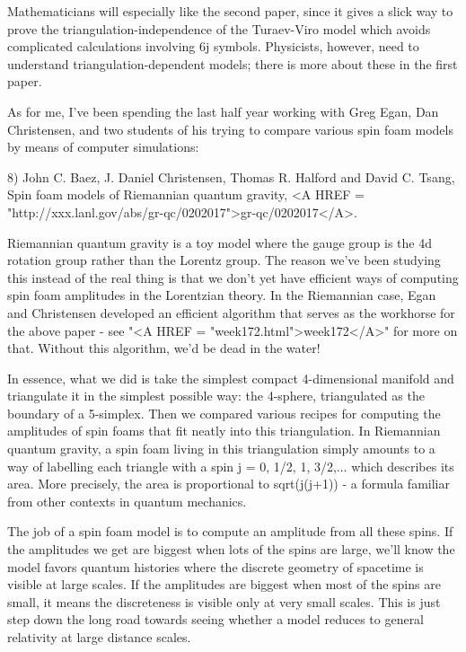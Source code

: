 Mathematicians will especially like the second paper, since it gives a
slick way to prove the triangulation-independence of the Turaev-Viro
model which avoids complicated calculations involving 6j symbols.  
Physicists, however, need to understand triangulation-dependent models;
there is more about these in the first paper.

As for me, I've been spending the last half year working with Greg Egan, 
Dan Christensen, and two students of his trying to compare various spin 
foam models by means of computer simulations:

8) John C. Baez, J. Daniel Christensen, Thomas R. Halford and
David C. Tsang, Spin foam models of Riemannian quantum gravity,
<A HREF = "http://xxx.lanl.gov/abs/gr-qc/0202017">gr-qc/0202017</A>.

Riemannian quantum gravity is a toy model where the gauge group is the
4d rotation group rather than the Lorentz group.  The reason we've been
studying this instead of the real thing is that we don't yet have
efficient ways of computing spin foam amplitudes in the Lorentzian
theory.  In the Riemannian case, Egan and Christensen developed an
efficient algorithm that serves as the workhorse for the above paper -
see "<A HREF = "week172.html">week172</A>" for more on that.
Without this algorithm, we'd be dead in the water!

In essence, what we did is take the simplest compact 4-dimensional
manifold and triangulate it in the simplest possible way: the 4-sphere,
triangulated as the boundary of a 5-simplex.  Then we compared various
recipes for computing the amplitudes of spin foams that fit neatly into
this triangulation.  In Riemannian quantum gravity, a spin foam living
in this triangulation simply amounts to a way of labelling each
triangle with a spin j = 0, 1/2, 1, 3/2,... which describes its area.
More precisely, the area is proportional to sqrt(j(j+1)) - a formula
familiar from other contexts in quantum mechanics.  

The job of a spin foam model is to compute an amplitude from all these
spins. If the amplitudes we get are biggest when lots of the spins are 
large, we'll know the model favors quantum histories where the discrete
geometry of spacetime is visible at large scales.  If the amplitudes are
biggest when most of the spins are small, it means the discreteness is
visible only at very small scales.  This is just step down the long road
towards seeing whether a model reduces to general relativity at large
distance scales.  

